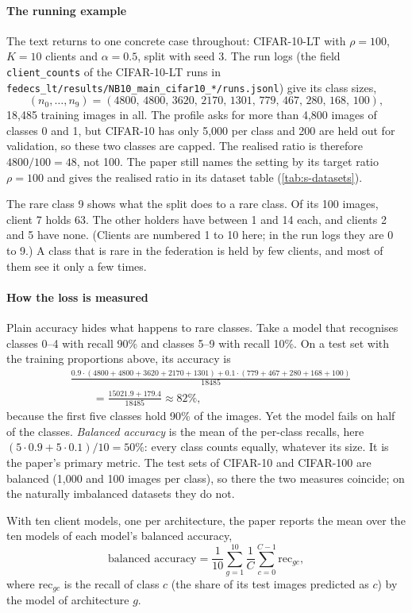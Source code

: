 \paragraph{The running example} The text returns to one concrete case throughout: CIFAR-10-LT with $\rho=100$, $K=10$
clients and $\alpha=0.5$, split with seed 3. The run logs (the field \texttt{client\_counts} of the CIFAR-10-LT
runs in \nolinkurl{fedecs_lt/results/NB10_main_cifar10_*/runs.jsonl}) give its class sizes,
\[
(n_0,\dots,n_9)=(4800,\,4800,\,3620,\,2170,\,1301,\,779,\,467,\,280,\,168,\,100),
\]
18,485 training images in all. The profile asks for more than 4,800 images of classes 0 and 1, but CIFAR-10 has only
5,000 per class and 200 are held out for validation, so these two classes are capped. The realised ratio is
therefore $4800/100=48$, not 100. The paper still names the setting by its target ratio $\rho=100$ and gives the
realised ratio in its dataset table (\cref{tab:s-datasets}).

The rare class 9 shows what the split does to a rare class. Of its 100 images, client 7 holds 63. The other holders
have between 1 and 14 each, and clients 2 and 5 have none. (Clients are numbered 1 to 10 here; in the run logs they
are 0 to 9.) A class that is rare in the federation is held by few clients, and most of them see it only a few
times.

\paragraph{How the loss is measured} Plain accuracy hides what happens to rare classes. Take a model that recognises
classes 0--4 with recall 90\% and classes 5--9 with recall 10\%. On a test set with the training proportions above,
its accuracy is
\begin{align*}
&\frac{0.9\cdot(4800+4800+3620+2170+1301)+0.1\cdot(779+467+280+168+100)}{18485}\\
&\qquad=\frac{15021.9+179.4}{18485}\approx82\%,
\end{align*}
because the first five classes hold 90\% of the images. Yet the model fails on half of the classes. \emph{Balanced
accuracy} is the mean of the per-class recalls, here $(5\cdot0.9+5\cdot0.1)/10=50\%$: every class counts equally,
whatever its size. It is the paper's primary metric. The test sets of CIFAR-10 and CIFAR-100 are balanced (1,000 and
100 images per class), so there the two measures coincide; on the naturally imbalanced datasets they do not.

With ten client models, one per architecture, the paper reports the mean over the ten models of each model's balanced
accuracy,
\[
\text{balanced accuracy}=\frac1{10}\sum_{g=1}^{10}\frac1C\sum_{c=0}^{C-1}\mathrm{rec}_{gc},
\]
where $\mathrm{rec}_{gc}$ is the recall of class $c$ (the share of its test images predicted as $c$) by the model of
architecture $g$.

